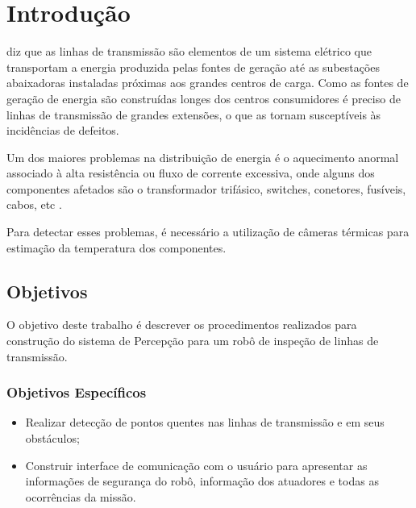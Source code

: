 \chapter{Introdução}
\label{chap:intro}

 diz que as linhas de transmissão são elementos de um sistema elétrico que transportam a energia produzida pelas fontes de geração até as subestações abaixadoras instaladas próximas aos grandes centros de carga. Como as fontes de geração
de energia são construídas longes dos centros consumidores é preciso de linhas de transmissão de grandes extensões, o que as tornam susceptíveis às incidências de defeitos.

Um dos maiores problemas na distribuição de energia é o aquecimento anormal associado à alta resistência ou fluxo de corrente excessiva, onde alguns dos componentes afetados são o transformador trifásico, switches, conetores, fusíveis, cabos, etc \cite{canahuire}.

Para detectar esses problemas, é necessário a utilização de câmeras térmicas para estimação da temperatura dos componentes. 

\section{Objetivos}
\label{sec:obj}


O objetivo deste trabalho é descrever os procedimentos realizados para construção do sistema de Percepção para um robô de inspeção de linhas de transmissão.  


\subsection{Objetivos Específicos}
\label{ssec:objesp}

\begin{itemize}
\item Realizar detecção de pontos quentes nas linhas de transmissão e em seus obstáculos;
\item Construir interface de comunicação com o usuário para apresentar as informações de segurança do robô, informação dos atuadores e todas as ocorrências da missão.
\end{itemize} 




